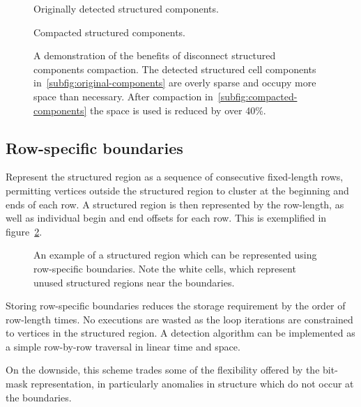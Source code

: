 \begin{figure}

\sidebyside
{
\drawmatrix[cell wd=0.8, cell ht=0.8]{\disjointAmatrix}
\caption{Originally detected structured components.}
\label{subfig:original-components}
}
{
\drawmatrix[cell wd=0.8, cell ht=0.8]{\disjointBmatrix}
\caption{Compacted structured components.}
\label{subfig:compacted-components}
}
\caption{A demonstration of the benefits of disconnect structured components compaction. The detected structured cell components in~\ref{subfig:original-components} are overly sparse and occupy more space than necessary. After compaction in~\ref{subfig:compacted-components} the space is used is reduced by over 40\%.}
\label{fig:disjoint-matrix}
\end{figure}


\subsection{Row-specific boundaries}

Represent the structured region as a sequence of consecutive fixed-length rows, permitting vertices outside the structured region to cluster at the beginning and ends of each row. A structured region is then represented by the row-length, as well as individual begin and end offsets for each row. This is exemplified in figure~\ref{fig:row-specific}.

\begin{figure}
\drawmatrix[cell wd=0.8, cell ht=0.8]{\bitmapmatrix}
\caption{An example of a structured region which can be represented using row-specific boundaries. Note the white cells, which represent unused structured regions near the boundaries.}
\label{fig:row-specific}
\end{figure}

Storing row-specific boundaries reduces the storage requirement by the order of row-length times.
No executions are wasted as the loop iterations are constrained to vertices in the structured region.
A detection algorithm can be implemented as a simple row-by-row traversal in linear time and space.


On the downside, this scheme trades some of the flexibility offered by the bit-mask representation, in particularly anomalies in structure which do not occur at the boundaries.


